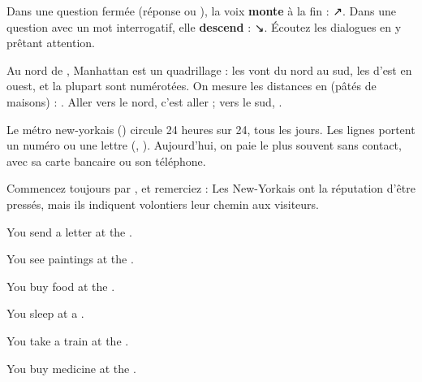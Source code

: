 \begin{astuce}[Et l'intonation ?]
Dans une question fermée (réponse  ou ), la voix \textbf{monte} à la fin :
 ↗. Dans une question avec un mot interrogatif, elle \textbf{descend} :
 ↘. Écoutez les dialogues en y prêtant attention.
\end{astuce}


\begin{culture}
Au nord de , Manhattan est un quadrillage : les  vont du nord au
sud, les  d'est en ouest, et la plupart sont numérotées. On mesure les distances en
 (pâtés de maisons) : . Aller vers le nord, c'est aller
 ; vers le sud, .
\end{culture}

\begin{paire}
\begin{culture}[Le métro]
Le métro new-yorkais () circule 24 heures sur 24, tous les jours. Les lignes portent un
numéro ou une lettre (, ). Aujourd'hui, on paie le plus souvent sans contact,
avec sa carte bancaire ou son téléphone.
\end{culture}
\begin{culture}
Commencez toujours par , et remerciez :  Les New-Yorkais ont la
réputation d'être pressés, mais ils indiquent volontiers leur chemin aux visiteurs.
\end{culture}
\end{paire}


\begin{anglais}
\begin{questions}
\item You send a letter at the .
\item You see paintings at the .
\item You buy food at the .
\item You sleep at a .
\item You take a train at the .
\item You buy medicine at the .
\end{questions}
\par{}
\end{anglais}

